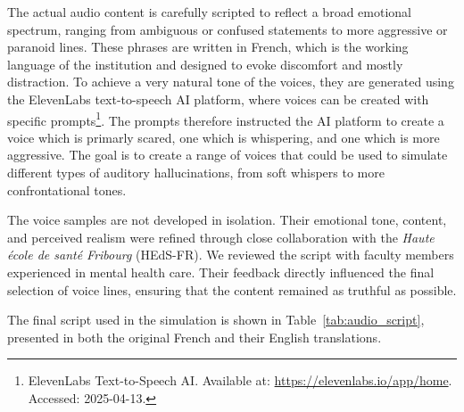 \vspace{1em}
The actual audio content is carefully scripted to reflect a broad emotional spectrum, ranging from ambiguous or confused statements to more aggressive or paranoid lines. These phrases are written in French, which is the working language of the institution and designed to evoke discomfort and mostly distraction. To achieve a very natural tone of the voices, they are generated using the ElevenLabs text-to-speech AI platform, where voices can be created with specific prompts\footnote{ElevenLabs Text-to-Speech AI. Available at: \url{https://elevenlabs.io/app/home}. Accessed: 2025-04-13.}. The prompts therefore instructed the AI platform to create a voice which is primarly scared, one which is whispering, and one which is more aggressive. The goal is to create a range of voices that could be used to simulate different types of auditory hallucinations, from soft whispers to more confrontational tones.

The voice samples are not developed in isolation. Their emotional tone, content, and perceived realism were refined through close collaboration with the \textit{Haute école de santé Fribourg} (HEdS-FR). We reviewed the script with faculty members experienced in mental health care. Their feedback directly influenced the final selection of voice lines, ensuring that the content remained as truthful as possible. 

\vspace{1em}
The final script used in the simulation is shown in Table~\ref{tab:audio_script}, presented in both the original French and their English translations.


